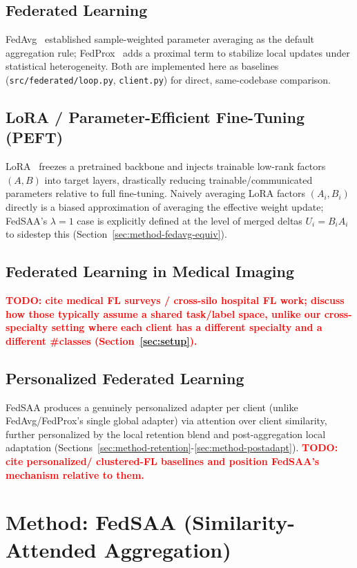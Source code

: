 \documentclass[11pt]{article}
\newcommand{\todo}[1]{\textcolor{red}{\textbf{TODO: #1}}}
\begin{document}
\subsection{Federated Learning}
FedAvg~\cite{mcmahan2017fedavg} established sample-weighted parameter averaging as the default
aggregation rule; FedProx~\cite{li2020fedprox} adds a proximal term to stabilize local updates
under statistical heterogeneity. Both are implemented here as baselines
(\texttt{src/federated/loop.py}, \texttt{client.py}) for direct, same-codebase comparison.

\subsection{LoRA / Parameter-Efficient Fine-Tuning (PEFT)}
LoRA~\cite{hu2021lora} freezes a pretrained backbone and injects trainable low-rank factors
$(A,B)$ into target layers, drastically reducing trainable/communicated parameters relative to
full fine-tuning. Naively averaging LoRA factors $(A_i,B_i)$ directly is a biased approximation
of averaging the effective weight update; FedSAA's $\lambda=1$ case is explicitly defined at the
level of merged deltas $U_i=B_iA_i$ to sidestep this (Section~\ref{sec:method-fedavg-equiv}).

\subsection{Federated Learning in Medical Imaging}
\todo{cite medical FL surveys / cross-silo hospital FL work; discuss how those typically assume a
shared task/label space, unlike our cross-specialty setting where each client has a different
specialty and a different \#classes (Section~\ref{sec:setup}).}

\subsection{Personalized Federated Learning}
FedSAA produces a genuinely personalized adapter per client (unlike FedAvg/FedProx's single
global adapter) via attention over client similarity, further personalized by the local
retention blend and post-aggregation local adaptation
(Sections~\ref{sec:method-retention}-\ref{sec:method-postadapt}). \todo{cite personalized/
clustered-FL baselines and position FedSAA's mechanism relative to them.}

\section{Method: FedSAA (Similarity-Attended Aggregation)}
\label{sec:method}
\end{document}
